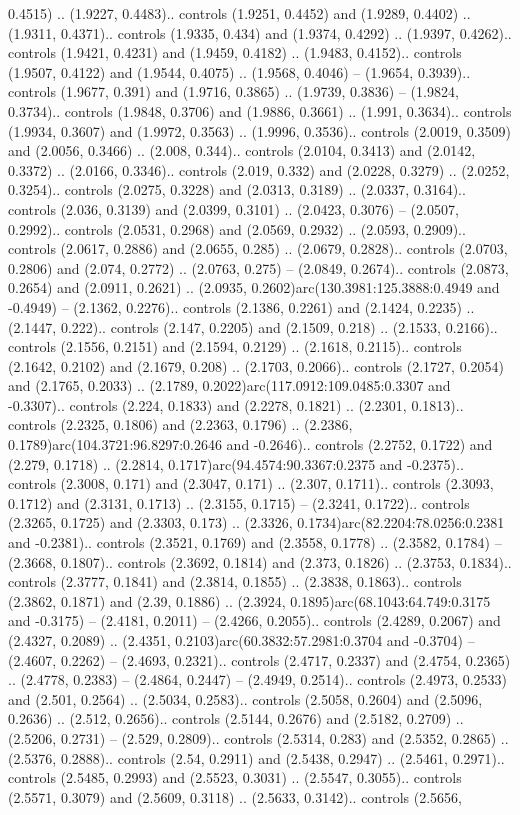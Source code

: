 0.4515) .. (1.9227, 0.4483).. controls (1.9251, 0.4452) and (1.9289, 0.4402) .. (1.9311, 0.4371).. controls (1.9335, 0.434) and (1.9374, 0.4292) .. (1.9397, 0.4262).. controls (1.9421, 0.4231) and (1.9459, 0.4182) .. (1.9483, 0.4152).. controls (1.9507, 0.4122) and (1.9544, 0.4075) .. (1.9568, 0.4046) -- (1.9654, 0.3939).. controls (1.9677, 0.391) and (1.9716, 0.3865) .. (1.9739, 0.3836) -- (1.9824, 0.3734).. controls (1.9848, 0.3706) and (1.9886, 0.3661) .. (1.991, 0.3634).. controls (1.9934, 0.3607) and (1.9972, 0.3563) .. (1.9996, 0.3536).. controls (2.0019, 0.3509) and (2.0056, 0.3466) .. (2.008, 0.344).. controls (2.0104, 0.3413) and (2.0142, 0.3372) .. (2.0166, 0.3346).. controls (2.019, 0.332) and (2.0228, 0.3279) .. (2.0252, 0.3254).. controls (2.0275, 0.3228) and (2.0313, 0.3189) .. (2.0337, 0.3164).. controls (2.036, 0.3139) and (2.0399, 0.3101) .. (2.0423, 0.3076) -- (2.0507, 0.2992).. controls (2.0531, 0.2968) and (2.0569, 0.2932) .. (2.0593, 0.2909).. controls (2.0617, 0.2886) and (2.0655, 0.285) .. (2.0679, 0.2828).. controls (2.0703, 0.2806) and (2.074, 0.2772) .. (2.0763, 0.275) -- (2.0849, 0.2674).. controls (2.0873, 0.2654) and (2.0911, 0.2621) .. (2.0935, 0.2602)arc(130.3981:125.3888:0.4949 and -0.4949) -- (2.1362, 0.2276).. controls (2.1386, 0.2261) and (2.1424, 0.2235) .. (2.1447, 0.222).. controls (2.147, 0.2205) and (2.1509, 0.218) .. (2.1533, 0.2166).. controls (2.1556, 0.2151) and (2.1594, 0.2129) .. (2.1618, 0.2115).. controls (2.1642, 0.2102) and (2.1679, 0.208) .. (2.1703, 0.2066).. controls (2.1727, 0.2054) and (2.1765, 0.2033) .. (2.1789, 0.2022)arc(117.0912:109.0485:0.3307 and -0.3307).. controls (2.224, 0.1833) and (2.2278, 0.1821) .. (2.2301, 0.1813).. controls (2.2325, 0.1806) and (2.2363, 0.1796) .. (2.2386, 0.1789)arc(104.3721:96.8297:0.2646 and -0.2646).. controls (2.2752, 0.1722) and (2.279, 0.1718) .. (2.2814, 0.1717)arc(94.4574:90.3367:0.2375 and -0.2375).. controls (2.3008, 0.171) and (2.3047, 0.171) .. (2.307, 0.1711).. controls (2.3093, 0.1712) and (2.3131, 0.1713) .. (2.3155, 0.1715) -- (2.3241, 0.1722).. controls (2.3265, 0.1725) and (2.3303, 0.173) .. (2.3326, 0.1734)arc(82.2204:78.0256:0.2381 and -0.2381).. controls (2.3521, 0.1769) and (2.3558, 0.1778) .. (2.3582, 0.1784) -- (2.3668, 0.1807).. controls (2.3692, 0.1814) and (2.373, 0.1826) .. (2.3753, 0.1834).. controls (2.3777, 0.1841) and (2.3814, 0.1855) .. (2.3838, 0.1863).. controls (2.3862, 0.1871) and (2.39, 0.1886) .. (2.3924, 0.1895)arc(68.1043:64.749:0.3175 and -0.3175) -- (2.4181, 0.2011) -- (2.4266, 0.2055).. controls (2.4289, 0.2067) and (2.4327, 0.2089) .. (2.4351, 0.2103)arc(60.3832:57.2981:0.3704 and -0.3704) -- (2.4607, 0.2262) -- (2.4693, 0.2321).. controls (2.4717, 0.2337) and (2.4754, 0.2365) .. (2.4778, 0.2383) -- (2.4864, 0.2447) -- (2.4949, 0.2514).. controls (2.4973, 0.2533) and (2.501, 0.2564) .. (2.5034, 0.2583).. controls (2.5058, 0.2604) and (2.5096, 0.2636) .. (2.512, 0.2656).. controls (2.5144, 0.2676) and (2.5182, 0.2709) .. (2.5206, 0.2731) -- (2.529, 0.2809).. controls (2.5314, 0.283) and (2.5352, 0.2865) .. (2.5376, 0.2888).. controls (2.54, 0.2911) and (2.5438, 0.2947) .. (2.5461, 0.2971).. controls (2.5485, 0.2993) and (2.5523, 0.3031) .. (2.5547, 0.3055).. controls (2.5571, 0.3079) and (2.5609, 0.3118) .. (2.5633, 0.3142).. controls (2.5656, 